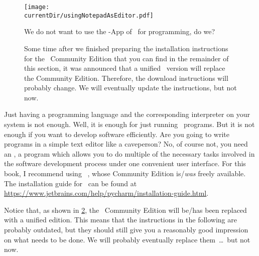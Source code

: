 %
\label{sec:installingPyCharm}%
%
\begin{figure}%
\centering%
\texttt{[image: \\currentDir/usingNotepadAsEditor.pdf]}%
\caption{We do not want to use the \nobreakdashes-App of \microsoftWindows\ for programming, do we?}%
\label{fig:usingNotepadAsEditor}%
\end{figure}%
%
\begin{figure}%
\centering%
%
\caption{%
Some time after we finished preparing the installation instructions for the \pycharm\ Community Edition that you can find in the remainder of this section, it was announced that a unified \pycharm\ version will replace the Community Edition. %
Therefore, the download instructions will probably change. %
We will eventually update the instructions, but not now.%
}%
\label{fig:unifiedPyCharm}%
\end{figure}%
%
Just having a programming language and the corresponding interpreter on your system is not enough.
Well, it is enough for just running \python\ programs.
But it is not enough if you want to develop software efficiently.
Are you going to write programs in a simple text editor like a caveperson?
No, of course not, you need an , a program which allows you to do multiple of the necessary tasks involved in the software development process under one convenient user interface.
For this book, I recommend using \pycharm~\cite{VHN2023HOADWP,Y2022PPADT,W2024PME}, whose Community Edition is/\emph{was} freely available.
The installation guide for \pycharm\ can be found at \url{https://www.jetbrains.com/help/pycharm/installation-guide.html}.

Notice that, as shown in \cref{fig:unifiedPyCharm}, the \pycharm\ Community Edition will be/has been replaced with a unified edition.
This means that the instructions in the following are probably outdated, but they should still give you a reasonably good impression on what needs to be done.
We will probably eventually replace them~{\dots}~but not now.%
%
\FloatBarrier%
%
%
\FloatBarrier%
\endhsection%
%

